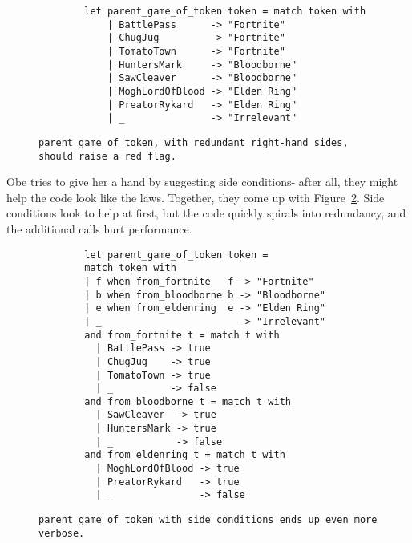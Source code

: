 \documentclass[manuscript,screen,review, 12pt]{acmart}
\begin{document}
        
        \begin{figure}
            \begin{center}
                \begin{verbatim}
        let parent_game_of_token token = match token with 
            | BattlePass      -> "Fortnite"
            | ChugJug         -> "Fortnite"
            | TomatoTown      -> "Fortnite"
            | HuntersMark     -> "Bloodborne"
            | SawCleaver      -> "Bloodborne"
            | MoghLordOfBlood -> "Elden Ring"
            | PreatorRykard   -> "Elden Ring"
            | _               -> "Irrelevant"
                \end{verbatim}
            \end{center}    

        \caption{\tt{parent\_game\_of\_token}, with redundant right-hand sides,
        should raise a red flag.} 
        \label{fig:barepgot}
        \end{figure}

        Obe tries to give her a hand by suggesting side conditions- after all,
        they might help the code look like the laws. Together, they come up with
        Figure~\ref{fig:sideconditionpgot}. Side conditions look to help at
        first, but the code quickly spirals into redundancy, and the additional
        calls hurt performance. 

        \begin{figure}
            \begin{center}
                \begin{verbatim}
        let parent_game_of_token token = 
        match token with 
        | f when from_fortnite   f -> "Fortnite"
        | b when from_bloodborne b -> "Bloodborne"
        | e when from_eldenring  e -> "Elden Ring"
        | _                        -> "Irrelevant"
        and from_fortnite t = match t with 
          | BattlePass -> true
          | ChugJug    -> true
          | TomatoTown -> true
          | _          -> false 
        and from_bloodborne t = match t with 
          | SawCleaver  -> true
          | HuntersMark -> true
          | _           -> false 
        and from_eldenring t = match t with 
          | MoghLordOfBlood -> true
          | PreatorRykard   -> true
          | _               -> false 
                \end{verbatim}
            \end{center}    

        \caption{\tt{parent\_game\_of\_token} with side conditions ends up 
        even more verbose.} 
        \label{fig:sideconditionpgot}
        \end{figure}
\end{document}
